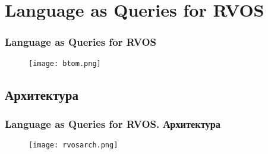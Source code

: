 
\section{Language as Queries for RVOS}

\begin{frame}
    \frametitle{Language as Queries for RVOS}
    \begin{figure}
        \texttt{[image: btom.png]}
    \end{figure}
\end{frame}

\subsection{Архитектура}

\begin{frame}
    \frametitle{Language as Queries for RVOS. Архитектура}
    \begin{figure}
        \texttt{[image: rvosarch.png]}
    \end{figure}
\end{frame}